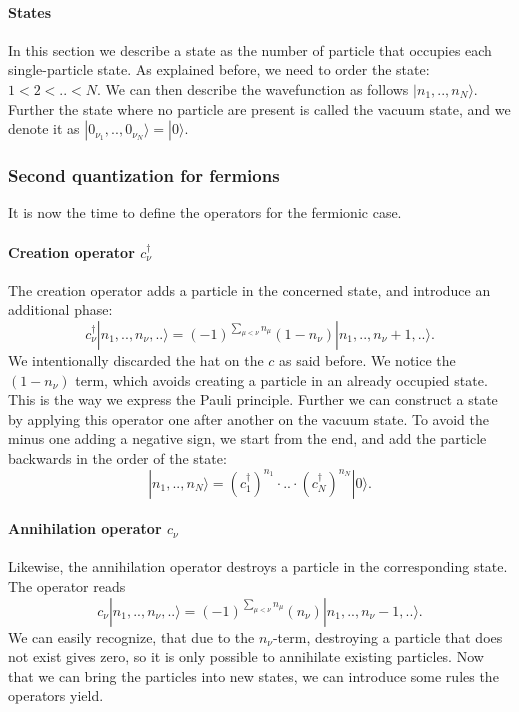 \documentclass[../main.tex]{subfile}
\begin{document}
\paragraph{States} $~$\\

In this section we describe a state as the number of particle that occupies each single-particle state. As explained before, we need to
order the state: $1<2<..<N$. We can then describe the wavefunction as follows $|n_{1},..,n_{N}\rangle$.
Further the state where no particle are present is called the vacuum state, and we denote it as $|0_{\nu_1},..,0_{\nu_N}\rangle = |0\rangle$.

\subsubsection{Second quantization for fermions}$~$\\

It is now the time to define the operators for the fermionic case.
\paragraph{Creation operator $c_\nu^{\dagger}$}$~$\\

The creation operator adds a particle in the concerned state, and introduce an additional phase:
\[
    c_{\nu}^{\dagger} |n_{1},..,n_{\nu},..\rangle = (-1)^{\sum_{\mu<\nu}n_{\mu}} (1-n_{\nu})|n_{1},..,n_{\nu}+1,..\rangle.
\]
We intentionally discarded the hat on the $c$ as said before.
We notice the $ (1-n_{\nu})$ term, which avoids creating a particle in an already occupied state. This is the way we express
the Pauli principle. 
Further we can construct a state by applying this operator one after another on the vacuum state. To avoid the minus one adding a negative sign, we start from the 
end, and add the particle backwards in the order of the state:
\[
    |n_{1},..,n_{N}\rangle = (c_{1}^{\dagger})^{n_{1}}\cdot ..\cdot (c_{N}^{\dagger})^{n_{N}} |0\rangle.
\]  

\paragraph{Annihilation operator $c_\nu$}$~$\\

Likewise, the annihilation operator destroys a particle in the corresponding state. The operator reads
\[
    c_{\nu} |n_{1},..,n_{\nu},..\rangle = (-1)^{\sum_{\mu<\nu}n_{\mu}} (n_{\nu})|n_{1},..,n_{\nu}-1,..\rangle.
\]
We can easily recognize, that due to the $n_{\nu}$-term, destroying a particle that does not exist gives zero, 
so it is only possible to annihilate existing particles. Now that we can bring the particles into new states, we can introduce some rules
the operators yield.
\end{document}
